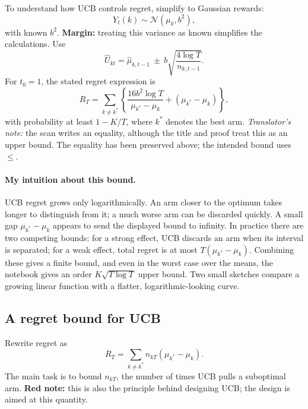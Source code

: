 To understand how UCB controls regret, simplify to Gaussian rewards:
\[
 Y_t(k)\sim\mathcal N(\mu_k,b^2),\tag{14.4}
\]
with known $b^2$. \textbf{Margin:} treating this variance as known simplifies the calculations. Use
\[
 \widehat U_{kt}=\widehat\mu_{k,t-1}
 \ \pm\ b\sqrt{\frac{4\log T}{n_{k,t-1}}}.\tag{14.5}
\]
For $t_0=1$, the stated regret expression is
\[
 R_T=\sum_{k\ne k^*}
 \left\{\frac{16b^2\log T}{\mu_{k^*}-\mu_k}
 +(\mu_{k^*}-\mu_k)\right\},\tag{14.6}
\]
with probability at least $1-K/T$, where $k^*$ denotes the best arm.
\textit{Translator's note:} the scan writes an equality, although the title and proof treat this as an upper bound. The equality has been preserved above; the intended bound uses $\le$.

\paragraph{My intuition about this bound.}
UCB regret grows only logarithmically. An arm closer to the optimum takes longer to distinguish from it; a much worse arm can be discarded quickly. A small gap $\mu_{k^*}-\mu_k$ appears to send the displayed bound to infinity. In practice there are two competing bounds: for a strong effect, UCB discards an arm when its interval is separated; for a weak effect, total regret is at most $T(\mu_{k^*}-\mu_k)$. Combining these gives a finite bound, and even in the worst case over the means, the notebook gives an order $K\sqrt{T\log T}$ upper bound. Two small sketches compare a growing linear function with a flatter, logarithmic-looking curve.

\subsection{A regret bound for UCB}
Rewrite regret as
\[
 R_T=\sum_{k\ne k^*}n_{kT}(\mu_{k^*}-\mu_k).
\]
The main task is to bound $n_{kT}$, the number of times UCB pulls a suboptimal arm. \textbf{Red note:} this is also the principle behind designing UCB; the design is aimed at this quantity.

